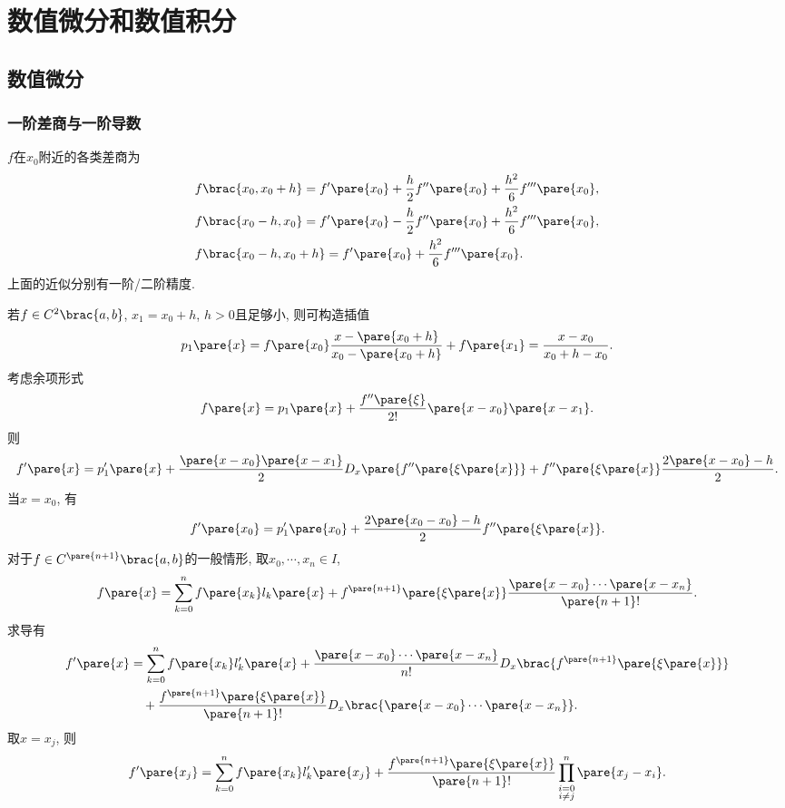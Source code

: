 \documentclass[hidelinks]{ctexart}
\begin{document}
\section{数值微分和数值积分} %
\label{sec:数值微分和数值积分}

\subsection{数值微分} %
\label{sub:数值微分}

\subsubsection{一阶差商与一阶导数} %
\label{ssub:一阶差商与一阶导数}

$f$在$x_0$附近的各类差商为
\begin{align*}
    & f\brac{x_0,x_0+h} = f'\pare{x_0} + \frac{h}{2}f''\pare{x_0} + \frac{h^2}{6}f'''\pare{x_0}, \\
    & f\brac{x_0-h,x_0} = f'\pare{x_0} - \frac{h}{2}f''\pare{x_0} + \frac{h^2}{6}f'''\pare{x_0}, \\
    & f\brac{x_0 - h, x_0 + h} = f'\pare{x_0} + \frac{h^2}{6}f'''\pare{x_0}.
\end{align*}
上面的近似分别有一阶/二阶精度.
\par
若$f\in C^2\brac{a,b}$, $x_1 = x_0 + h$, $h>0$且足够小, 则可构造插值
\[ p_1\pare{x} = f\pare{x_0} \frac{x-\pare{x_0+h}}{x_0 - \pare{x_0 + h}} + f\pare{x_1} = \frac{x-x_0}{x_0 + h - x_0}. \]
考虑余项形式
\[ f\pare{x} = p_1\pare{x} + \frac{f''\pare{\xi}}{2!}\pare{x-x_0}\pare{x-x_1}. \]
则
\[ f'\pare{x} = p'_1\pare{x} + \frac{\pare{x-x_0}\pare{x-x_1}}{2}D_x\pare{f''\pare{\xi\pare{x}}} + f''\pare{\xi\pare{x}} \frac{2\pare{x-x_0} - h}{2}. \]
当$x=x_0$, 有
\[ f'\pare{x_0} = p'_1\pare{x_0} + \frac{2\pare{x_0 - x_0} - h}{2}f''\pare{\xi\pare{x}}. \]
对于$f\in C^{\pare{n+1}}\brac{a,b}$的一般情形, 取$x_0, \cdots, x_n \in I$,
\[ f\pare{x} = \sum_{k=0}^n f\pare{x_k}l_k\pare{x} + f^{\pare{n+1}}\pare{\xi\pare{x}} \frac{\pare{x-x_0}\cdots \pare{x-x_n}}{\pare{n+1}!}. \]
求导有
\begin{align*}
    f'\pare{x} &= \sum_{k=0}^n f\pare{x_k}l'_k\pare{x} + \frac{\pare{x-x_0}\cdots \pare{x-x_n}}{n!}D_x\brac{f^{\pare{n+1}}\pare{\xi\pare{x}}}\\
     &\quad + \frac{f^{\pare{n+1}}\pare{\xi\pare{x}}}{\pare{n+1}!}D_x\brac{\pare{x-x_0}\cdots \pare{x-x_n}}.
\end{align*}
取$x=x_j$, 则
\[ f'\pare{x_j} = \sum_{k=0}^n f\pare{x_k}l'_k\pare{x_j} + \frac{f^{\pare{n+1}}\pare{\xi\pare{x}}}{\pare{n+1}!} \prod_{\substack{i=0\\ i\neq j}}^n \pare{x_j - x_i}. \]
\end{document}
